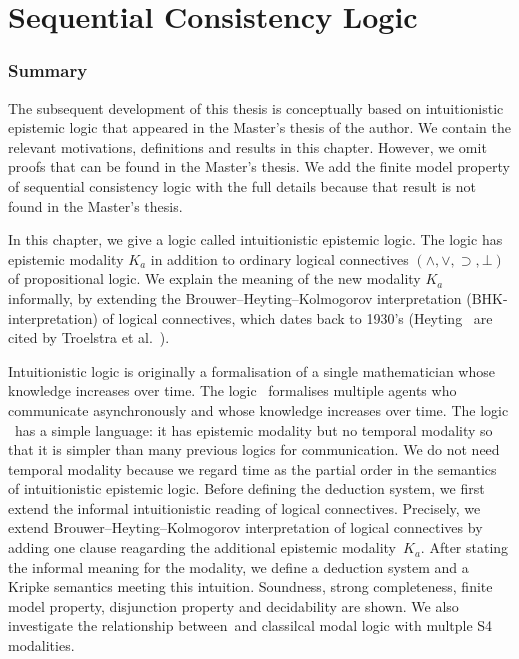 \chapter{Sequential Consistency Logic}
\label{ch:seqcon}

  \subsection{Summary}

  The subsequent development of this thesis is conceptually based on
  intuitionistic epistemic logic that appeared in the Master's thesis
  of the author.
  We contain the relevant motivations, definitions and results in this chapter.
  However, we omit proofs that
  can be found in the Master's thesis.
  We add the finite model property of sequential consistency logic
  with the full details because that result is not found in the Master's thesis.

  In this chapter, we give a logic called intuitionistic epistemic logic.
  The logic has epistemic modality $K_a$ in addition to ordinary logical connectives
  $(\wedge, \vee, \supset, \bot)$ of propositional logic.
  We explain the meaning of the new modality $K_a$ informally, by extending
  the Brouwer--Heyting--Kolmogorov interpretation (BHK-interpretation) of logical
  connectives, which dates back to 1930's
  (Heyting~\cite{heyting1930, heyting1931intuitionistische}
  are cited by Troelstra et al.~\cite{troelstra1988constructivism}).

  Intuitionistic logic is originally a formalisation of a single mathematician whose
  knowledge
  increases over time.  The logic \iec\, formalises multiple agents who communicate
  asynchronously and whose knowledge increases over time.
  The logic \iec\, has a simple language:
  it has epistemic modality but no temporal modality
  so that it is simpler than many previous logics for communication.
  We do not need temporal modality because
  we regard time as
  the partial order in the semantics of intuitionistic epistemic logic.
  Before defining the deduction system, we first extend the informal intuitionistic
  reading of logical connectives.
  Precisely,
  we extend Brouwer--Heyting--Kolmogorov interpretation of logical connectives
  by adding one clause reagarding the additional epistemic modality~$K_a$.
  After stating the informal meaning for the modality,
  we define a deduction system and a Kripke semantics meeting this intuition.
  Soundness, strong completeness, finite
  model property, disjunction property and decidability are
  shown.
  We also investigate the relationship between \iec\,and classilcal modal logic with multple
  S4 modalities.

